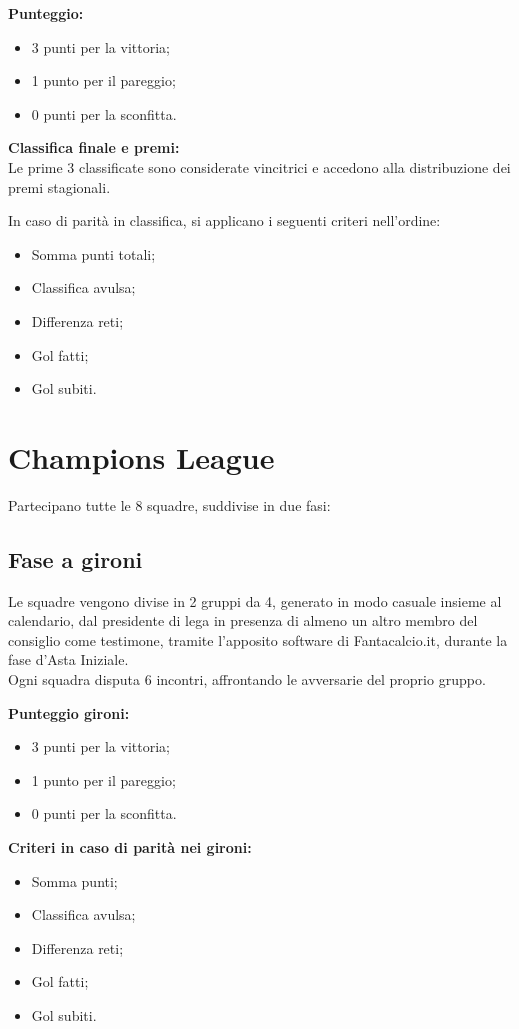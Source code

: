 \noindent \textbf{Punteggio:}
\begin{itemize}
  \item 3 punti per la vittoria;
  \item 1 punto per il pareggio;
  \item 0 punti per la sconfitta.
\end{itemize}

\noindent \textbf{Classifica finale e premi:}\\
Le prime 3 classificate sono considerate vincitrici e accedono alla distribuzione dei premi stagionali.

\noindent
In caso di parità in classifica, si applicano i seguenti criteri nell’ordine:
\begin{itemize}
  \item Somma punti totali;
  \item Classifica avulsa;
  \item Differenza reti;
  \item Gol fatti;
  \item Gol subiti.
\end{itemize}

\section{Champions League}
\label{art:8.2}
\noindent Partecipano tutte le 8 squadre, suddivise in due fasi:

\subsection{Fase a gironi}
\label{art:8.2.1}

Le squadre vengono divise in 2 gruppi da 4, generato in modo casuale insieme al calendario, dal presidente di lega in presenza di almeno un altro membro del consiglio come testimone, tramite l’apposito software di Fantacalcio.it, durante la fase d’Asta Iniziale.\\
Ogni squadra disputa 6 incontri, affrontando le avversarie del proprio gruppo.

\noindent \textbf{Punteggio gironi:}
\begin{itemize}
  \item 3 punti per la vittoria;
  \item 1 punto per il pareggio;
  \item 0 punti per la sconfitta.
\end{itemize}

\noindent
\noindent \textbf{Criteri in caso di parità nei gironi:}
\begin{itemize}
  \item Somma punti;
  \item Classifica avulsa;
  \item Differenza reti;
  \item Gol fatti;
  \item Gol subiti.
\end{itemize}

